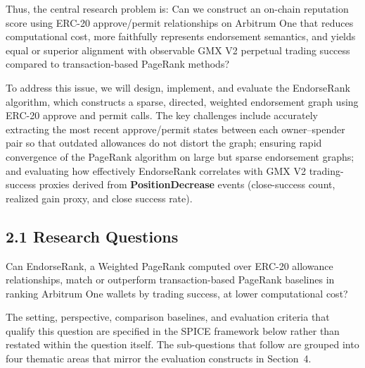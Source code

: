 Thus, the central research problem is: Can we construct an on-chain reputation score using ERC-20 approve/permit relationships on Arbitrum One that reduces computational cost, more faithfully represents endorsement semantics, and yields equal or superior alignment with observable GMX V2 perpetual trading success compared to transaction-based PageRank methods?


To address this issue, we will design, implement, and evaluate the EndorseRank algorithm, which constructs a sparse, directed, weighted endorsement graph using ERC-20 approve and permit calls. The key challenges include accurately extracting the most recent approve/permit states between each owner--spender pair so that outdated allowances do not distort the graph; ensuring rapid convergence of the PageRank algorithm on large but sparse endorsement graphs; and evaluating how effectively EndorseRank correlates with GMX V2 trading-success proxies derived from \textbf{PositionDecrease} events (close-success count, realized gain proxy, and close success rate).


\subsection*{2.1 Research Questions}
\label{sec:research-questions}

Can EndorseRank, a Weighted PageRank computed over ERC-20 allowance relationships, match or outperform transaction-based PageRank baselines in ranking Arbitrum One wallets by trading success, at lower computational cost?


The setting, perspective, comparison baselines, and evaluation criteria that qualify this question are specified in the SPICE framework below rather than restated within the question itself. The sub-questions that follow are grouped into four thematic areas that mirror the evaluation constructs in Section~4.


